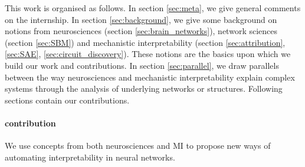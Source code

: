 \documentclass{article}
\begin{document}
This work is organised as follows. In section \ref{sec:meta}, we give general comments on the internship. In section \ref{sec:background}, we give some background on notions from neurosciences (section \ref{sec:brain_networks}), network sciences (section \ref{sec:SBM}) and mechanistic interpretability (section \ref{sec:attribution}, \ref{sec:SAE}, \ref{sec:circuit_discovery}). These notions are the basics upon which we build our work and contributions. In section \ref{sec:parallel}, we draw parallels between the way neurosciences and mechanistic interpretability explain complex systems through the analysis of underlying networks or structures. Following sections contain our contributions.

\paragraph{contribution} We use concepts from both neurosciences and MI to propose new ways of automating interpretability in neural networks.
\end{document}
